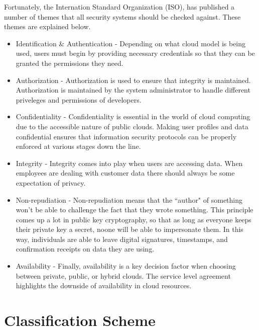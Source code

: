 \documentclass[a4paper, 8pt]{article} %
\begin{document}
Fortunately, the Internation Standard Organization (ISO), has published a number of themes that all security systems should be checked against.  These themes are explained below.  
\begin{itemize}
\item Identification \& Authentication - Depending on what cloud model is being used, users must begin by providing necessary credentials so that they can be granted the permissions they need.  

\item Authorization - Authorization is used to ensure that integrity is maintained.  Authorization is maintained by the system administrator to handle different priveleges and permissions of developers.  

\item Confidentiality - Confidentiality is essential in the world of cloud computing due to the accessible nature of public clouds.  Making user profiles and data confidential ensures that information security protocols can be properly enforced at various stages down the line.  

\item Integrity - Integrity comes into play when users are accessing data.  When employees are dealing with customer data there should always be some expectation of privacy.  

\item Non-repudiation - Non-repudiation means that the ``author" of something won't be able to challenge the fact that they wrote something.  This principle comes up a lot in public key cryptography, so that as long as everyone keeps their private key a secret, noone will be able to impersonate them.  In this way, individuals are able to leave digital signatures, timestamps, and confirmation receipts on data they are using.  

\item Availability - Finally, availability is a key decision factor when choosing between private, public, or hybrid clouds.  The service level agreement highlights the downside of availability in cloud resources.  
\end{itemize}

\section*{Classification Scheme}
\end{document}
